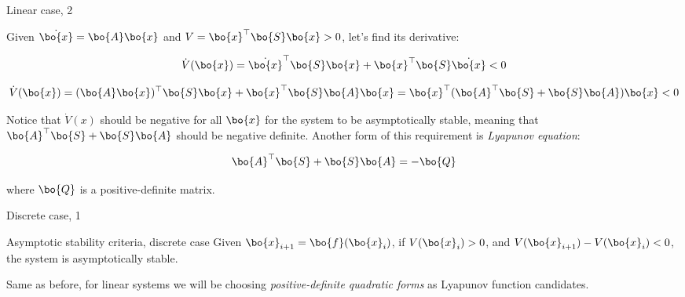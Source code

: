 \documentclass{beamer}
\begin{document}
\begin{frame}{Linear case, 2}
\begin{flushleft}

Given $\dot{\bo{x}} = \bo{A}\bo{x}$ and $V = \bo{x}^\top\bo{S}\bo{x} > 0$, let's find its derivative:

\begin{equation}
    \dot V(\bo{x}) = \dot{\bo{x}}^\top\bo{S}\bo{x} + 
    \bo{x}^\top\bo{S}\dot{\bo{x}} < 0
\end{equation}

\begin{equation}
    \dot V(\bo{x}) = (\bo{A}\bo{x})^\top\bo{S}\bo{x} + 
    \bo{x}^\top\bo{S}\bo{A}\bo{x} = 
    \bo{x}^\top(\bo{A}^\top\bo{S} + \bo{S}\bo{A})\bo{x} < 0
\end{equation}

Notice that $\dot V(x)$ should be negative for all $\bo{x}$ for the system to be asymptotically stable, meaning that $\bo{A}^\top\bo{S} + \bo{S}\bo{A}$ should be negative definite. Another form of this requirement is \emph{Lyapunov equation}:

\begin{equation}
    \bo{A}^\top\bo{S} + \bo{S}\bo{A} = -\bo{Q}
\end{equation}

where $\bo{Q}$ is a positive-definite matrix.

\end{flushleft}
\end{frame}



\begin{frame}{Discrete case, 1}
\begin{flushleft}

\begin{block}{Asymptotic stability criteria, discrete case}
Given $\bo{x}_{i+1} = \bo{f}(\bo{x}_i)$, if $V(\bo{x}_i) > 0$, and $V(\bo{x}_{i+1}) - V(\bo{x}_i) < 0$, the system is asymptotically stable.
\end{block}

\bigskip 

Same as before, for linear systems we will be choosing \emph{positive-definite quadratic forms} as Lyapunov function candidates.

\end{flushleft}
\end{frame}
\end{document}
